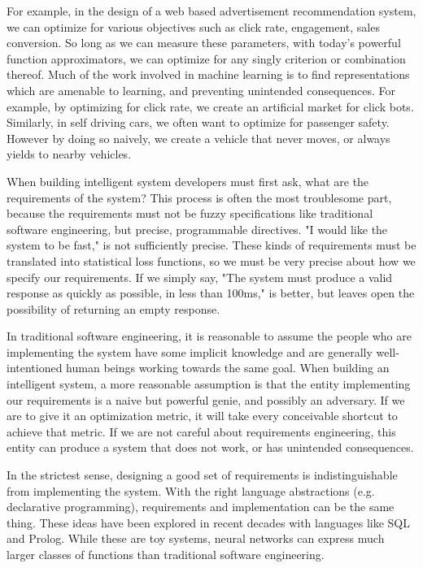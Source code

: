 \documentclass[12pt,initial,twoside,maitrise]{dms}
\numberwithin{equation}{section}
\numberwithin{table}{chapter}
\numberwithin{figure}{chapter}
\begin{document}
For example, in the design of a web based advertisement recommendation system, we can optimize for various objectives such as click rate, engagement, sales conversion. So long as we can measure these parameters, with today's powerful function approximators, we can optimize for any singly criterion or combination thereof. Much of the work involved in machine learning is to find representations which are amenable to learning, and preventing unintended consequences. For example, by optimizing for click rate, we create an artificial market for click bots. Similarly, in self driving cars, we often want to optimize for passenger safety. However by doing so naively, we create a vehicle that never moves, or always yields to nearby vehicles.

When building intelligent system developers must first ask, what are the requirements of the system? This process is often the most troublesome part, because the requirements must not be fuzzy specifications like traditional software engineering, but precise, programmable directives. "I would like the system to be fast," is not sufficiently precise. These kinds of requirements must be translated into statistical loss functions, so we must be very precise about how we specify our requirements. If we simply say, "The system must produce a valid response as quickly as possible, in less than 100ms," is better, but leaves open the possibility of returning an empty response.

In traditional software engineering, it is reasonable to assume the people who are implementing the system have some implicit knowledge and are generally well-intentioned human beings working towards the same goal. When building an intelligent system, a more reasonable assumption is that the entity implementing our requirements is a naive but powerful genie, and possibly an adversary. If we are to give it an optimization metric, it will take every conceivable shortcut to achieve that metric. If we are not careful about requirements engineering, this entity can produce a system that does not work, or has unintended consequences.

In the strictest sense, designing a good set of requirements is indistinguishable from implementing the system. With the right language abstractions (e.g. declarative programming), requirements and implementation can be the same thing. These ideas have been explored in recent decades with languages like SQL and Prolog. While these are toy systems, neural networks can express much larger classes of functions than traditional software engineering.
\end{document}
